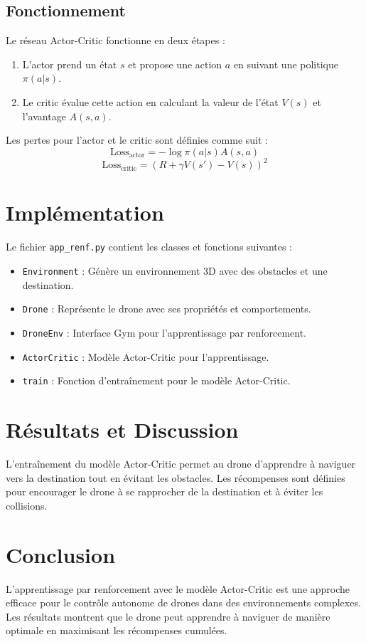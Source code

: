 \documentclass[a4paper, 12pt]{article}
\begin{document}
\subsection{Fonctionnement}
Le réseau Actor-Critic fonctionne en deux étapes :
\begin{enumerate}
    \item L'actor prend un état $s$ et propose une action $a$ en suivant une politique $\pi(a|s)$.
    \item Le critic évalue cette action en calculant la valeur de l'état $V(s)$ et l'avantage $A(s, a)$.
\end{enumerate}

Les pertes pour l'actor et le critic sont définies comme suit :
\[
\text{Loss}_{\text{actor}} = -\log \pi(a|s) A(s, a)
\]
\[
\text{Loss}_{\text{critic}} = \left( R + \gamma V(s') - V(s) \right)^2
\]

\section{Implémentation}
Le fichier \texttt{app\_renf.py} contient les classes et fonctions suivantes :
\begin{itemize}
    \item \texttt{Environment} : Génère un environnement 3D avec des obstacles et une destination.
    \item \texttt{Drone} : Représente le drone avec ses propriétés et comportements.
    \item \texttt{DroneEnv} : Interface Gym pour l'apprentissage par renforcement.
    \item \texttt{ActorCritic} : Modèle Actor-Critic pour l'apprentissage.
    \item \texttt{train} : Fonction d'entraînement pour le modèle Actor-Critic.
\end{itemize}

\section{Résultats et Discussion}
L'entraînement du modèle Actor-Critic permet au drone d'apprendre à naviguer vers la destination tout en évitant les obstacles. Les récompenses sont définies pour encourager le drone à se rapprocher de la destination et à éviter les collisions.

\section{Conclusion}
L'apprentissage par renforcement avec le modèle Actor-Critic est une approche efficace pour le contrôle autonome de drones dans des environnements complexes. Les résultats montrent que le drone peut apprendre à naviguer de manière optimale en maximisant les récompenses cumulées.
\end{document}
